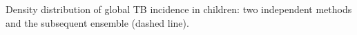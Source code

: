 \label{fig:cdens}Density distribution of global TB incidence in children: two independent methods and the subsequent ensemble (dashed line).